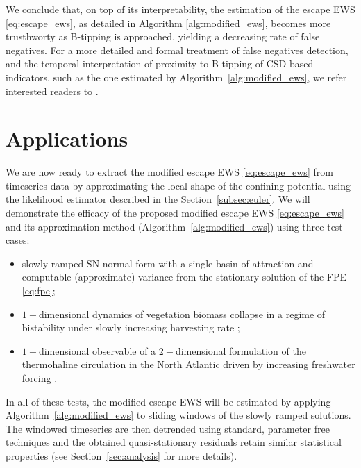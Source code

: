 \documentclass[a4paper,fleqn]{cas-sc}
\newcommand{\sref}[1]{Section~\ref{#1}}
\begin{document}
We conclude that, on top of its interpretability, the estimation of the escape EWS \eqref{eq:escape_ews}, as detailed in Algorithm \ref{alg:modified_ews}, becomes more trusthworty as B-tipping is approached, yielding a decreasing rate of false negatives.
For a more detailed and formal treatment of false negatives detection, and the temporal interpretation of proximity to B-tipping of CSD-based indicators, such as the one estimated by Algorithm~\ref{alg:modified_ews}, we refer interested readers to \cite{Ashwin2025}.

\section{Applications}\label{sec:applications}
We are now ready to extract the modified escape EWS \eqref{eq:escape_ews} from timeseries data by approximating the local shape of the confining potential using the likelihood estimator described in the \sref{subsec:euler}.
We will demonstrate the efficacy of the proposed modified escape EWS \eqref{eq:escape_ews} and its approximation method (Algorithm~\ref{alg:modified_ews}) using three test cases:
%
\begin{itemize}
     \item slowly ramped SN normal form with a single basin of attraction and computable (approximate) variance from the stationary solution of the FPE \eqref{eq:fpe};
     \item $1-$dimensional dynamics of vegetation biomass collapse in a regime of bistability under slowly increasing harvesting rate \cite{May1977};
     \item $1-$dimensional observable of a $2-$dimensional formulation of the thermohaline circulation in the North Atlantic driven by increasing freshwater forcing \cite{Stommel1961}.
\end{itemize}
%
In all of these tests, the modified escape EWS will be estimated by applying Algorithm~\ref{alg:modified_ews} to sliding windows of the slowly ramped solutions.
The windowed timeseries are then detrended using standard, parameter free techniques and the obtained quasi-stationary residuals retain similar statistical properties (see \sref{sec:analysis} for more details).
%
\end{document}
